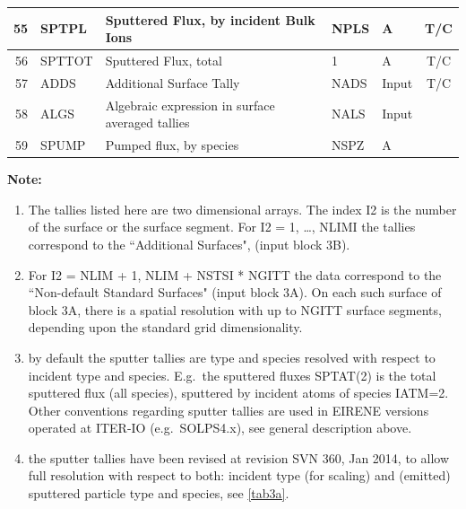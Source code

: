 \begin{landscape}
\begin{longtable}{|r|l|l|l|l|c|}
    \\    \hline
    55                       & SPTPL                  & Sputtered Flux, by
    incident Bulk Ions       & NPLS
                             & \si{\ampere}           & T/C
    \\  \hline
    56                       & SPTTOT                 & Sputtered Flux, total
                             & 1
                             & \si{\ampere}           & T/C
    \\  \hline\hline
    57                       & ADDS                   & Additional Surface Tally
                             & NADS
                             & Input                  & T/C
    \\  \hline
    58                       & ALGS                   & Algebraic expression in
    surface averaged tallies & NALS
                             & Input                  &
    \\  \hline
    59                       & SPUMP                  & Pumped flux, by species
                             & NSPZ
                             & \si{\ampere}           &
    \\  \hline
  \end{longtable}

  \textbf{Note:}

  \begin{enumerate}
    \item The tallies listed here are two dimensional arrays.
	  The  index I2 is the number of the surface or the surface
	  segment.
	  For I2 = 1, \dots, NLIMI the tallies correspond to the ``Additional Surfaces",
	  (input block 3B).
    \item For I2 = NLIM + 1, NLIM + NSTSI * NGITT the data correspond to the
	  ``Non-default Standard Surfaces" (input block 3A).
	  On each such surface of block 3A, there is a spatial resolution with up to
	  NGITT surface segments, depending upon the standard grid dimensionality.
    \item by default the sputter tallies are type and species resolved with
	  respect to incident type and species.
	  E.g.\ the sputtered fluxes SPTAT(2) is the total sputtered flux (all species),
	  sputtered by incident atoms of species IATM=2.
	  Other conventions regarding sputter tallies are used in EIRENE versions
	  operated at ITER-IO (e.g.\ SOLPS4.x), see general description above.
    \item the sputter tallies have been revised at revision SVN 360, Jan 2014,
	  to allow full resolution with respect to both: incident type (for scaling) and
	  (emitted) sputtered particle type and species, see \cref{tab3a}.
  \end{enumerate}


\end{landscape}
